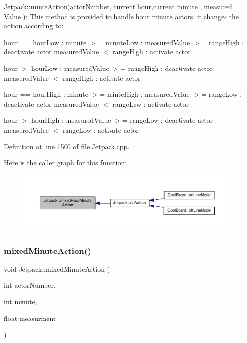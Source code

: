 Jetpack\+::minte\+Action(actor\+Number, current hour,current minute , measured Value )\+: This method is provided to handle hour minute actors. it changes the action according to\+:

hour == hour\+Low \+: minute $>$= minute\+Low \+: measured\+Value $>$= range\+High \+: deactivate actor measured\+Value $<$ range\+High \+: activate actor

hour $>$ hour\+Low \+: measured\+Value $>$= range\+High \+: deactivate actor measured\+Value $<$ range\+High \+: activate actor

hour == hour\+High \+: minute $>$= minte\+High \+: measured\+Value $>$= range\+Low \+: deactivate actor measured\+Value $<$ range\+Low \+: activate actor

hour $>$ hour\+High \+: measured\+Value $>$= range\+Low \+: deactivate actor measured\+Value $<$ range\+Low \+: activate actor 

Definition at line 1500 of file Jetpack.\+cpp.

Here is the caller graph for this function\+:\nopagebreak
\begin{figure}[H]
\begin{center}
\leavevmode
\includegraphics[width=350pt]{class_jetpack_a273dae1517b56f0242e28b8944edc26b_icgraph}
\end{center}
\end{figure}
\mbox{\label{class_jetpack_acf8ed1fb594b9e8e224f4ed872a8e093}} 
\subsubsection{\texorpdfstring{mixed\+Minute\+Action()}{mixedMinuteAction()}}
{\footnotesize\ttfamily void Jetpack\+::mixed\+Minute\+Action (\begin{DoxyParamCaption}\item[{int}]{actor\+Number,  }\item[{int}]{minute,  }\item[{float}]{measurment }\end{DoxyParamCaption})}

